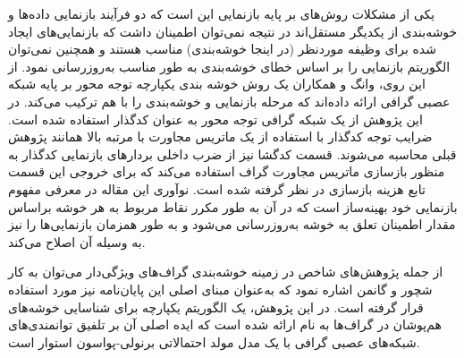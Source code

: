 یکی از مشکلات روش‌های بر پایه بازنمایی این است که دو فرآیند بازنمایی‌ داده‌ها و خوشه‌بندی از یکدیگر مستقل‌اند در نتیجه نمی‌توان اطمینان داشت که بازنمایی‌های ایجاد شده برای وظیفه مورد‌نظر (در اینجا خوشه‌بندی) مناسب هستند و همچنین نمی‌توان الگوریتم بازنمایی را بر اساس خطای خوشه‌بندی به طور مناسب به‌روزرسانی نمود. از این روی، وانگ و همکاران\cite{2019attributed}  یک روش خوشه بندی یکپارچه توجه محور بر پایه شبکه عصبی گرافی ارائه داده‌اند که مرحله بازنمایی و خوشه‌بندی را با هم ترکیب می‌کند. در این پژوهش از یک شبکه گرافی توجه محور به عنوان کدگذار  استفاده شده‌ است. ضرایب توجه کدگذار با استفاده از یک ماتریس مجاورت با مرتبه بالا همانند پژوهش قبلی محاسبه می‌شوند. قسمت کدگشا  نیز از ضرب داخلی بردار‌های بازنمایی کدگذار به منظور بازسازی ماتریس مجاورت گراف استفاده می‌کند که برای خروجی این قسمت تابع هزینه بازسازی در نظر گرفته شده است. نوآوری این مقاله در معرفی مفهوم بازنمایی خود بهینه‌ساز است که در آن به طور مکرر نقاط مربوط به هر خوشه براساس مقدار اطمینان تعلق به خوشه به‌روزرسانی می‌شود و به طور همزمان بازنمایی‌ها را نیز به وسیله آن اصلاح می‌کند.


از جمله پژوهش‌های شاخص در زمینه خوشه‌بندی گراف‌های ویژگی‌دار می‌توان به کار شچور و گانمن اشاره نمود \cite{nocd2019} که به‌عنوان مبنای اصلی این پایان‌نامه نیز مورد استفاده قرار گرفته است. در این پژوهش، یک الگوریتم یکپارچه برای شناسایی خوشه‌های هم‌پوشان در گراف‌ها به نام  ارائه شده است که ایده اصلی آن بر تلفیق توانمندی‌های شبکه‌های عصبی گرافی با یک مدل مولد احتمالاتی برنولی-پواسون استوار است.

